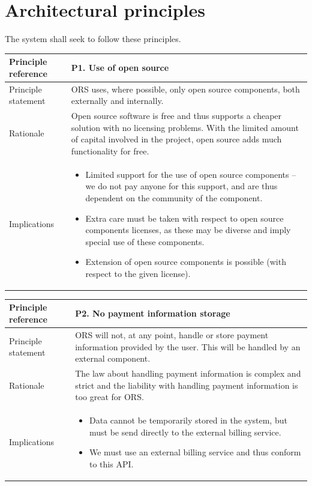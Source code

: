 \documentclass[a4paper,11pt]{report}
\begin{document}
\section{Architectural principles}
\label{sec:arch-princ}
The system shall seek to follow these principles.
\begin{center}
  \begin{tabular}[h!]{| >{\columncolor{gray}}p{} | p{} |}
    \hline
    Principle reference & P1. Use of open source\\
    \hline
    Principle statement & ORS uses, where possible, only open source components, both externally and internally. \\
    \hline
    Rationale & Open source software is free and thus supports a cheaper solution with no licensing problems. With the limited amount of capital involved in the project, open source adds much functionality for free.\\
    \hline
    Implications & 
      \begin{itemize}
        \item Limited support for the use of open source components -- we do not pay anyone for this support, and are thus dependent on the community of the component.
        \item Extra care must be taken with respect to open source components licenses, as these may be diverse and imply special use of these components.
        \item Extension of open source components is possible (with respect to the given license).
      \end{itemize}\\
    \hline
  \end{tabular}
\end{center}

\begin{center}
  \begin{tabular}[h!]{| >{\columncolor{gray}}p{} | p{} |}
    \hline
    Principle reference & P2. No payment information storage\\
    \hline
    Principle statement & ORS will not, at any point, handle or store payment information provided by the user. This will be handled by an external component.\\
    \hline
    Rationale & The law about handling payment information is complex and strict and the liability with handling payment information is too great for ORS.\\
    \hline
    Implications & 
      \begin{itemize}
        \item Data cannot be temporarily stored in the system, but must be send directly to the external billing service.
        \item We must use an external billing service and thus conform to this API.
      \end{itemize}\\
    \hline
  \end{tabular}
\end{center}
\end{document}
